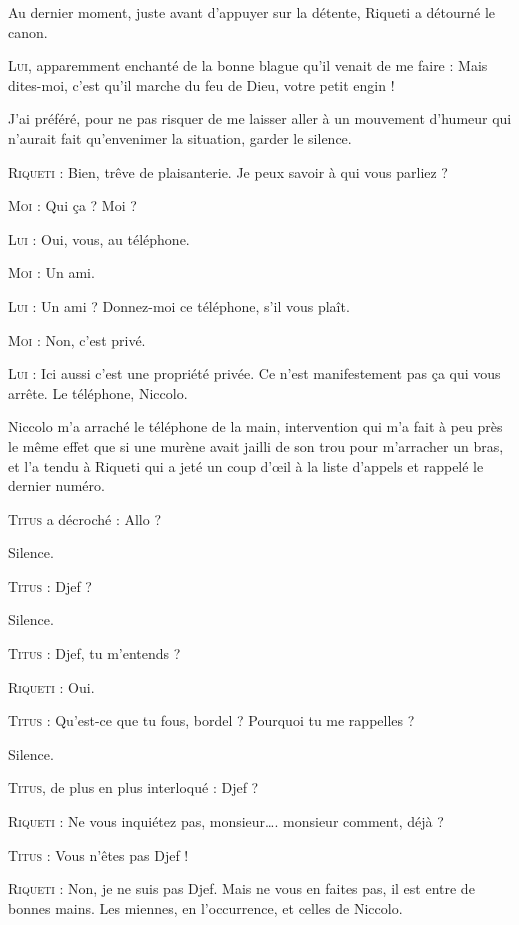 Au dernier moment, juste avant d’appuyer sur la détente, Riqueti a détourné le canon.

\begin{dialogue}

\textsc{Lui}, apparemment enchanté de la bonne blague qu’il venait de me faire : Mais dites-moi, c’est qu’il marche du feu de Dieu, votre petit engin !

\end{dialogue}

J’ai préféré, pour ne pas risquer de me laisser aller à un mouvement d’humeur qui n’aurait fait qu’envenimer la situation, garder le silence.

\begin{dialogue}

\textsc{Riqueti} : Bien, trêve de plaisanterie. Je peux savoir à qui vous parliez ?

\textsc{Moi} : Qui ça ? Moi ?

\textsc{Lui} : Oui, vous, au téléphone.

\textsc{Moi} : Un ami.

\textsc{Lui} : Un ami ? Donnez-moi ce téléphone, s’il vous plaît.

\textsc{Moi} : Non, c’est privé.

\textsc{Lui} : Ici aussi c’est une propriété privée. Ce n’est manifestement pas ça qui vous arrête. Le téléphone, Niccolo.

\end{dialogue}

Niccolo m’a arraché le téléphone de la main, intervention qui m’a fait à peu près le même effet que si une murène avait jailli de son trou pour m’arracher un bras, et l’a tendu à Riqueti qui a jeté un coup d’œil à la liste d’appels et rappelé le dernier numéro.

\begin{dialogue}

\textsc{Titus} a décroché : Allo ?

Silence.

\textsc{Titus} : Djef ?

Silence.

\textsc{Titus} : Djef, tu m’entends ?

\textsc{Riqueti} : Oui.

\textsc{Titus} : Qu’est-ce que tu fous, bordel ? Pourquoi tu me rappelles ?

Silence.

\textsc{Titus}, de plus en plus interloqué : Djef ?

\textsc{Riqueti} : Ne vous inquiétez pas, monsieur…. monsieur comment, déjà ?

\textsc{Titus} : Vous n’êtes pas Djef !

\textsc{Riqueti} : Non, je ne suis pas Djef. Mais ne vous en faites pas, il est entre de bonnes mains. Les miennes, en l’occurrence, et celles de Niccolo.

\end{dialogue}


